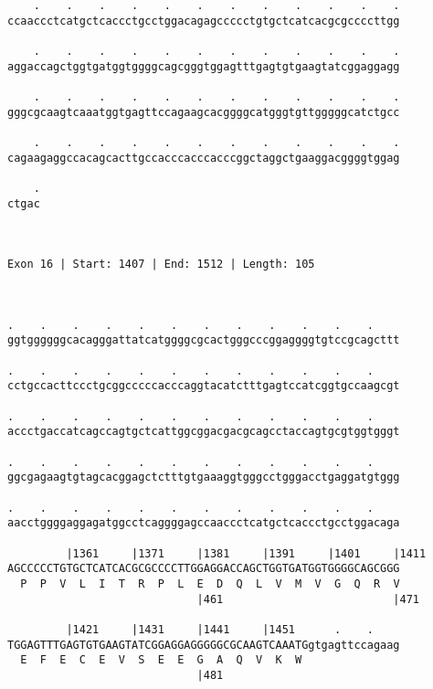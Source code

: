 \documentclass{article}
\begin{document}
\begin{Verbatim}
    .    .    .    .    .    .    .    .    .    .    .    .
ccaaccctcatgctcaccctgcctggacagagccccctgtgctcatcacgcgccccttgg
                                                            
    .    .    .    .    .    .    .    .    .    .    .    .
aggaccagctggtgatggtggggcagcgggtggagtttgagtgtgaagtatcggaggagg
                                                            
    .    .    .    .    .    .    .    .    .    .    .    .
gggcgcaagtcaaatggtgagttccagaagcacggggcatgggtgttgggggcatctgcc
                                                            
    .    .    .    .    .    .    .    .    .    .    .    .
cagaagaggccacagcacttgccacccacccacccggctaggctgaaggacggggtggag
                                                            
    .
ctgac
     
     
 
Exon 16 | Start: 1407 | End: 1512 | Length: 105



.    .    .    .    .    .    .    .    .    .    .    .    
ggtggggggcacagggattatcatggggcgcactgggcccggaggggtgtccgcagcttt
                                                            
.    .    .    .    .    .    .    .    .    .    .    .    
cctgccacttccctgcggcccccacccaggtacatctttgagtccatcggtgccaagcgt
                                                            
.    .    .    .    .    .    .    .    .    .    .    .    
accctgaccatcagccagtgctcattggcggacgacgcagcctaccagtgcgtggtgggt
                                                            
.    .    .    .    .    .    .    .    .    .    .    .    
ggcgagaagtgtagcacggagctctttgtgaaaggtgggcctgggacctgaggatgtggg
                                                            
.    .    .    .    .    .    .    .    .    .    .    .    
aacctggggaggagatggcctcaggggagccaaccctcatgctcaccctgcctggacaga
                                                            
         |1361     |1371     |1381     |1391     |1401     |1411
AGCCCCCTGTGCTCATCACGCGCCCCTTGGAGGACCAGCTGGTGATGGTGGGGCAGCGGG
  P  P  V  L  I  T  R  P  L  E  D  Q  L  V  M  V  G  Q  R  V
                             |461                          |471
  
         |1421     |1431     |1441     |1451      .    .    
TGGAGTTTGAGTGTGAAGTATCGGAGGAGGGGGCGCAAGTCAAATGgtgagttccagaag
  E  F  E  C  E  V  S  E  E  G  A  Q  V  K  W               
                             |481                           
  

\end{Verbatim}
\end{document}
